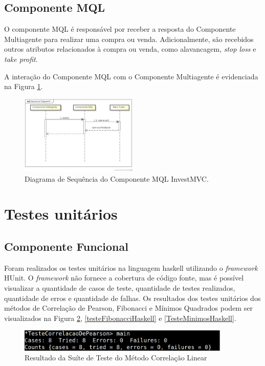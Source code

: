 \subsection{Componente MQL}

O componente MQL é responsável por receber a resposta do Componente Multiagente para realizar uma compra ou venda. Adicionalmente, são recebidos outros atributos relacionados à compra ou venda, como alavancagem, \textit{stop loss} e \textit{take profit}.

A interação do Componente MQL com o Componente Multiagente é evidenciada na Figura \ref{sequenciaMQL}.

\begin{figure}[H]
\centering
\includegraphics[width=0.5\textwidth]{figuras/sequenciaMQL}
\caption{Diagrama de Sequência do Componente MQL InvestMVC.}
\label{sequenciaMQL}
\end{figure}


\section{Testes unitários}

\subsection{Componente Funcional}

Foram realizados os testes unitários na linguagem haskell utilizando o \textit{framework} HUnit. O \textit{framework} não fornece a cobertura de código fonte, mas é possível visualizar a quantidade de casos de teste, quantidade de testes realizados, quantidade de erros e quantidade de falhas. Os resultados dos testes unitários dos métodos de Correlação de Pearson, Fibonacci e Mínimos Quadrados podem ser visualizados na Figura \ref{testeCorrelacaoHaskell}, \ref{testeFibonacciHaskell} e \ref{TesteMinimosHaskell}.

\begin{figure}[H]
\centering
\includegraphics[width=0.9\textwidth]{figuras/testeCorrelacaoHaskell}
\caption{Resultado da Suíte de Teste do Método Correlação Linear}
\label{testeCorrelacaoHaskell}
\end{figure}

